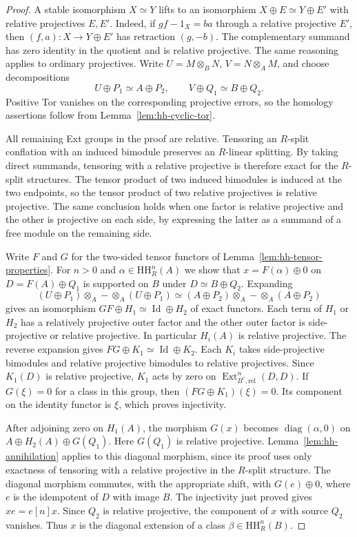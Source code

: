 \documentclass[12pt,a4paper,english,reqno]{amsart}
\numberwithin{equation}{section}
\theoremstyle{plain}
\theoremstyle{definition}
\begin{document}
\begin{proof}
A stable isomorphism $X\simeq Y$ lifts to an isomorphism
$X\oplus E\simeq Y\oplus E'$ with relative projectives $E,E'$.
Indeed, if $gf-1_X=ba$ through a relative projective $E'$,
then $(f,a):X\to Y\oplus E'$ has retraction $(g,-b)$.
The complementary summand has zero identity in the quotient
and is relative projective. The same reasoning applies to
ordinary projectives. Write $U=M\otimes_BN$, $V=N\otimes_AM$,
and choose decompositions
\[
 U\oplus P_1\simeq A\oplus P_2,\qquad
 V\oplus Q_1\simeq B\oplus Q_2.
\]
Positive Tor vanishes on the corresponding projective errors,
so the homology assertions follow from Lemma~\ref{lem:hh-cyclic-tor}.

All remaining Ext groups in the proof are relative. Tensoring an
$R$-split conflation with an induced bimodule preserves an
$R$-linear splitting. By taking direct summands, tensoring with
a relative projective is therefore exact for the $R$-split
structures. The tensor product of two induced bimodules is
induced at the two endpoints, so the tensor product of two
relative projectives is relative projective. The same conclusion
holds when one factor is relative projective and the other is
projective on each side, by expressing the latter as a summand
of a free module on the remaining side.

Write $F$ and $G$ for the two-sided tensor functors of
Lemma~\ref{lem:hh-tensor-properties}. For $n>0$ and
$\alpha\in\mathrm{HH}^n_R(A)$ we show that $x=F(\alpha)\oplus0$
on $D=F(A)\oplus Q_1$ is supported on $B$ under
$D\simeq B\oplus Q_2$. Expanding
\[
 (U\oplus P_1)\otimes_A-\otimes_A(U\oplus P_1)
 \simeq (A\oplus P_2)\otimes_A-\otimes_A(A\oplus P_2)
\]
gives an isomorphism $GF\oplus H_1\simeq\operatorname{Id}\oplus H_2$
of exact functors. Each term of $H_1$ or $H_2$ has a relatively
projective outer factor and the other outer factor is
side-projective or relative projective. In particular $H_i(A)$
is relative projective. The reverse expansion gives
$FG\oplus K_1\simeq\operatorname{Id}\oplus K_2$. Each $K_i$
takes side-projective bimodules and relative projective
bimodules to relative projectives. Since $K_1(D)$ is relative projective,
$K_1$ acts by zero on $\operatorname{Ext}^n_{B^e,\mathrm{rel}}(D,D)$.
If $G(\xi)=0$ for a class in this group, then
$(FG\oplus K_1)(\xi)=0$. Its component on the identity functor
is $\xi$, which proves injectivity.

After adjoining zero on $H_1(A)$, the morphism $G(x)$ becomes
$\operatorname{diag}(\alpha,0)$ on
$A\oplus H_2(A)\oplus G(Q_1)$. Here $G(Q_1)$ is relative projective.
Lemma~\ref{lem:hh-annihilation} applies to this diagonal morphism,
since its proof uses only exactness of tensoring with a relative
projective in the $R$-split structure. The diagonal morphism commutes, with the appropriate shift,
with $G(e)\oplus0$, where $e$ is the idempotent of $D$ with
image $B$. The injectivity just proved gives $xe=e[n]x$.
Since $Q_2$ is relative projective, the component of $x$
with source $Q_2$ vanishes. Thus $x$ is the diagonal
extension of a class $\beta\in\mathrm{HH}^n_R(B)$.


\end{proof}
\end{document}
